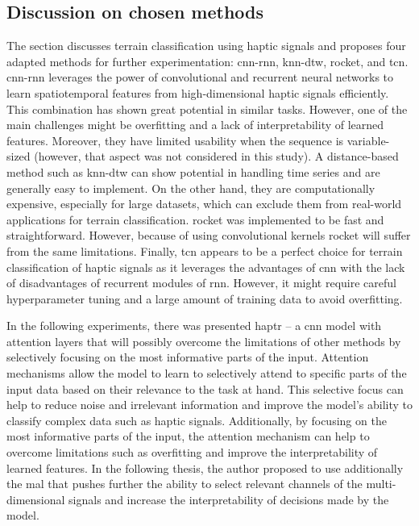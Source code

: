 \documentclass[a4paper, 10pt, twoside]{report}
\begin{document}
\subsection{Discussion on chosen methods}

The section discusses terrain classification using haptic signals and proposes four adapted methods for further experimentation: \acrshort{cnn}-\acrshort{rnn}, \acrshort{knn}-\acrshort{dtw}, \acrshort{rocket}, and \acrshort{tcn}. \acrshort{cnn}-\acrshort{rnn} leverages the power of convolutional and recurrent neural networks to learn spatiotemporal features from high-dimensional haptic signals efficiently. This combination has shown great potential in similar tasks. However, one of the main challenges might be overfitting and a lack of interpretability of learned features. Moreover, they have limited usability when the sequence is variable-sized (however, that aspect was not considered in this study). A distance-based method such as \acrshort{knn}-\acrshort{dtw} can show potential in handling time series and are generally easy to implement. On the other hand, they are computationally expensive, especially for large datasets, which can exclude them from real-world applications for terrain classification. \acrshort{rocket} was implemented to be fast and straightforward. However, because of using convolutional kernels \acrshort{rocket} will suffer from the same limitations. Finally, \acrshort{tcn} appears to be a perfect choice for terrain classification of haptic signals as it leverages the advantages of \acrshort{cnn} with the lack of disadvantages of recurrent modules of \acrshort{rnn}. However, it might require careful hyperparameter tuning and a large amount of training data to avoid overfitting.

In the following experiments, there was presented \acrshort{haptr} -- a \acrshort{cnn} model with attention layers that will possibly overcome the limitations of other methods by selectively focusing on the most informative parts of the input. Attention mechanisms allow the model to learn to selectively attend to specific parts of the input data based on their relevance to the task at hand. This selective focus can help to reduce noise and irrelevant information and improve the model's ability to classify complex data such as haptic signals. Additionally, by focusing on the most informative parts of the input, the attention mechanism can help to overcome limitations such as overfitting and improve the interpretability of learned features. In the following thesis, the author proposed to use additionally the \acrfull{mal} that pushes further the ability to select relevant channels of the multi-dimensional signals and increase the interpretability of decisions made by the model.
\end{document}
